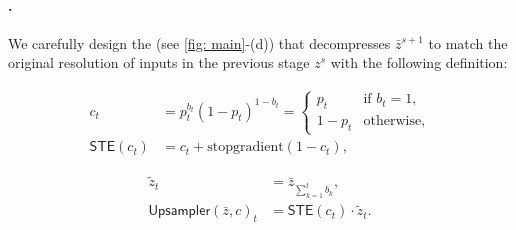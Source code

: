 \paragraph{\Upsampler{}.}

We carefully design the \upsampler{} (see \cref{fig: main}-(d)) that decompresses $\bar{z}^{s+1}$ to match the original resolution of inputs in the previous stage $z^{s}$ with the following definition:

\begin{minipage}[t]{.48\linewidth}
\vspace{-3mm}
  \begin{align}
    \label{eq: coefficient}
    c_t &= p_t^{b_t} (1-p_t)^{1-b_t}
    = \begin{cases}
        p_t & \text{if } b_t=1,\\
        1 - p_t & \text{otherwise},
    \end{cases}\\
    \label{eq: STE}
    \mathsf{STE}(c_t) &= c_t + \text{stopgradient}(1-c_t),
  \end{align}
\end{minipage}\hfill
\begin{minipage}[t]{.51\linewidth}
  \begin{align}
    \label{eq: Upsampler-Upsample}
    \tilde{z}_t &= \bar{z}_{\sum_{k=1}^t b_k},\\
    \label{eq: Upsampler-Mult}
    \mathsf{Upsampler}(\bar{z}, c)_t &= \mathsf{STE}\left(c_t\right) \cdot \tilde{z}_t.
  \end{align}
\end{minipage}


